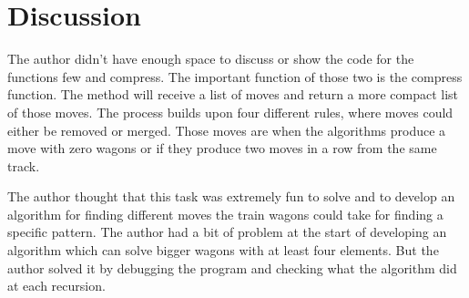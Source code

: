 \documentclass[a4paper,11pt]{article}
\begin{document}
\section*{Discussion}
The author didn't have enough space to discuss or show the code for the functions few and compress. The important function of those two is the compress function. The method will receive a list of moves and return a more compact list of those moves. The process builds upon four different rules, where moves could either be removed or merged. Those moves are when the algorithms produce a move with zero wagons or if they produce two moves in a row from the same track.

The author thought that this task was extremely fun to solve and to develop an algorithm for finding different moves the train wagons could take for finding a specific pattern. The author had a bit of problem at the start of developing an algorithm which can solve bigger wagons with at least four elements. But the author solved it by debugging the program and checking what the algorithm did at each recursion.
\end{document}
